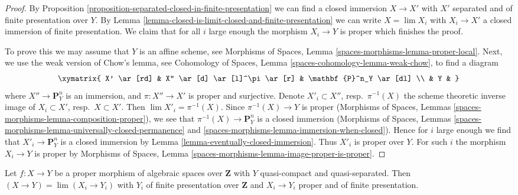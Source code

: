 \begin{proof}
By Proposition \ref{proposition-separated-closed-in-finite-presentation}
we can find a closed immersion $X \to X'$ with $X'$ separated and of
finite presentation over $Y$. By
Lemma \ref{lemma-closed-is-limit-closed-and-finite-presentation}
we can write $X = \lim X_i$ with $X_i \to X'$ a closed immersion of
finite presentation. We claim that for all $i$ large enough
the morphism $X_i \to Y$ is proper which finishes the proof.

\medskip\noindent
To prove this we may assume that $Y$ is an affine scheme, see
Morphisms of Spaces, Lemma \ref{spaces-morphisms-lemma-proper-local}.
Next, we use the weak version of Chow's lemma, see
Cohomology of Spaces, Lemma \ref{spaces-cohomology-lemma-weak-chow},
to find a diagram
$$
\xymatrix{
X' \ar[rd] & X'' \ar[d] \ar[l]^\pi \ar[r] & \mathbf{P}^n_Y \ar[dl] \\
& Y &
}
$$
where $X'' \to \mathbf{P}^n_Y$ is an immersion, and
$\pi : X'' \to X'$ is proper and surjective. Denote
$X'_i \subset X''$, resp.\ $\pi^{-1}(X)$ the scheme theoretic inverse image of
$X_i \subset X'$, resp.\ $X \subset X'$.
Then $\lim X'_i = \pi^{-1}(X)$. Since $\pi^{-1}(X) \to Y$ is proper
(Morphisms of Spaces, Lemmas \ref{spaces-morphisms-lemma-composition-proper}),
we see that $\pi^{-1}(X) \to \mathbf{P}^n_Y$ is a closed immersion
(Morphisms of Spaces, Lemmas
\ref{spaces-morphisms-lemma-universally-closed-permanence} and
\ref{spaces-morphisms-lemma-immersion-when-closed}).
Hence for $i$ large enough
we find that $X'_i \to \mathbf{P}^n_Y$ is a closed immersion by
Lemma \ref{lemma-eventually-closed-immersion}.
Thus $X'_i$ is proper over $Y$.
For such $i$ the morphism $X_i \to Y$ is proper by
Morphisms of Spaces, Lemma \ref{spaces-morphisms-lemma-image-proper-is-proper}.
\end{proof}

\begin{lemma}
\label{lemma-proper-limit-of-proper-finite-presentation-noetherian}
Let $f : X \to Y$ be a proper morphism of algebraic spaces over $\mathbf{Z}$
with $Y$ quasi-compact and quasi-separated. Then
$(X \to Y) = \lim (X_i \to Y_i)$ with $Y_i$ of finite presentation
over $\mathbf{Z}$ and $X_i \to Y_i$ proper and of finite presentation.
\end{lemma}


